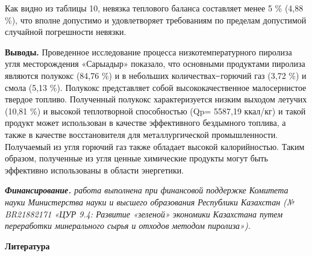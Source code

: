 % 

\begin{multicols}{2}
Как видно из таблицы 10, невязка теплового баланса составляет менее 5 \%
(4,88 \%), что вполне допустимо и удовлетворяет требованиям по пределам
допустимой случайной погрешности невязки.

{\bfseries Выводы.} Проведенное исследование процесса низкотемпературного
пиролиза угля месторождения «Сарыадыр» показало, что основными
продуктами пиролиза являются полукокс (84,76 \%) и в небольших
количествах ̶ горючий газ (3,72 \%) и смола (5,13 \%). Полукокс
представляет собой высококачественное малосернистое твердое топливо.
Полученный полукокс характеризуется низким выходом летучих (10,81 \%) и
высокой теплотворной способностью (Qp= 5587,19 ккал/кг) и такой продукт может использован в качестве
эффективного бездымного топлива, а также в качестве восстановителя для
металлургической промышленности. Получаемый из угля горючий газ также
обладает высокой калорийностью. Таким образом, полученные из угля ценные
химические продукты могут быть эффективно использованы в области
энергетики.

\emph{{\bfseries Финансирование.} работа выполнена при финансовой поддержке
Комитета науки Министерства науки и высшего образования Республики
Казахстан (№ BR21882171 «ЦУР 9.4: Развитие «зеленой» экономики
Казахстана путем переработки минерального сырья и отходов методом
пиролиза»).}
\end{multicols}

\begin{center}
{\bfseries Литература}
\end{center}


